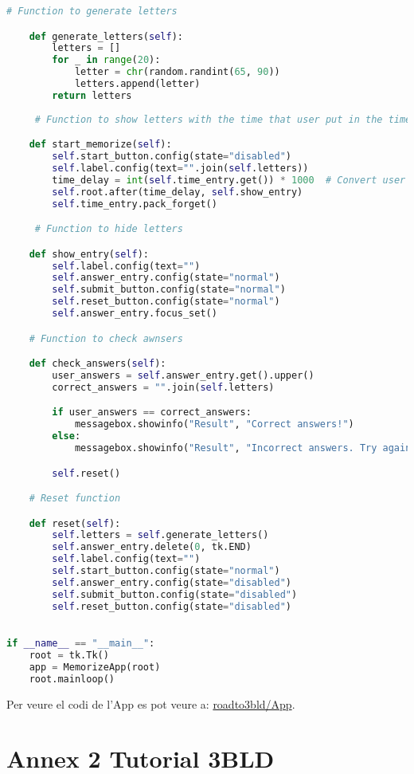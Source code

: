 \begin{lstlisting}[language=Python, style=colorEX, caption=Codi sencer de l'App]
     # Function to generate letters

    def generate_letters(self):
        letters = []
        for _ in range(20):
            letter = chr(random.randint(65, 90))
            letters.append(letter)
        return letters
    
     # Function to show letters with the time that user put in the time_entry textbox.

    def start_memorize(self):
        self.start_button.config(state="disabled")
        self.label.config(text="".join(self.letters))
        time_delay = int(self.time_entry.get()) * 1000  # Convert user seconds to milliseconds
        self.root.after(time_delay, self.show_entry)
        self.time_entry.pack_forget()  

     # Function to hide letters

    def show_entry(self):
        self.label.config(text="")
        self.answer_entry.config(state="normal")
        self.submit_button.config(state="normal")
        self.reset_button.config(state="normal")
        self.answer_entry.focus_set()

    # Function to check awnsers 

    def check_answers(self):
        user_answers = self.answer_entry.get().upper()
        correct_answers = "".join(self.letters)

        if user_answers == correct_answers:
            messagebox.showinfo("Result", "Correct answers!")
        else:
            messagebox.showinfo("Result", "Incorrect answers. Try again.")

        self.reset()

    # Reset function

    def reset(self):
        self.letters = self.generate_letters()
        self.answer_entry.delete(0, tk.END)
        self.label.config(text="")
        self.start_button.config(state="normal")
        self.answer_entry.config(state="disabled")
        self.submit_button.config(state="disabled")
        self.reset_button.config(state="disabled")
   

if __name__ == "__main__":
    root = tk.Tk()
    app = MemorizeApp(root)
    root.mainloop()

    \end{lstlisting}


Per veure el codi de l'App es pot veure a: \href{https://cubderubik.github.io/roadto3bld/App.Html}{roadto3bld/App}.


\chapter{Annex 2 Tutorial 3BLD}
\setcounter{chapter}{1}
\pagestyle{annex2}


\newpage


\newpage


\newpage
